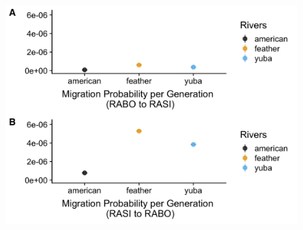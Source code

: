 \documentclass[proquest,12pt,final]{ucthesis-CA2012} %
\begin{document}
\begin{ucmainmatter}
\begin{figure}
{\centering \includegraphics[width=1\linewidth]{figure/ch2/figure_06_coalescent_ancMigration_ptsCI} 

}


\end{figure}
\end{ucmainmatter}
\end{document}
